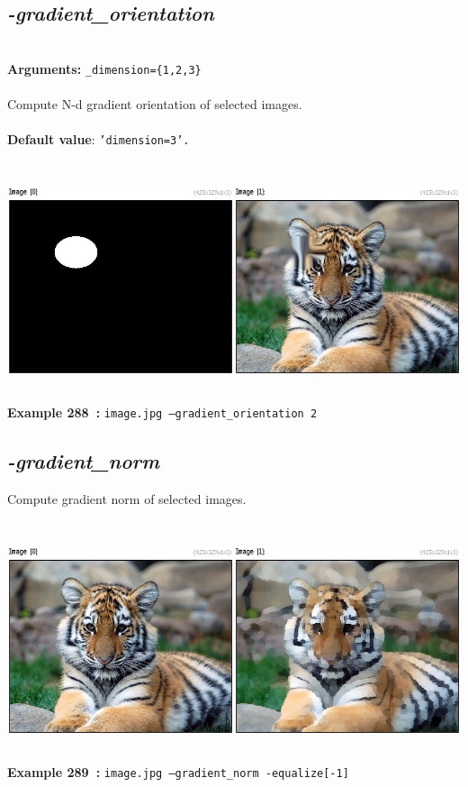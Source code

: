 \documentclass[a4paper,11pt,twoside]{book}
\begin{document}
\subsection{\emph{-gradient\_orientation} }\vspace*{-0.5em}
~\\\textbf{Arguments: } 
{\small \texttt{\_dimension=\{1,2,3\}}}\\~\\
Compute N-d gradient orientation of selected images.
~\\~\\\textbf{Default value}: {\small \texttt{'dimension=3'.}}
\begin{center}\includegraphics[keepaspectratio=true,height=7cm,width=\textwidth]{img/gmic_def288.jpg}\\
{\footnotesize \textbf{Example 288~:} \texttt{image.jpg --gradient\_orientation 2}}
\end{center}

\subsection{\emph{-gradient\_norm} }\vspace*{-0.5em}
Compute gradient norm of selected images.
\begin{center}\includegraphics[keepaspectratio=true,height=7cm,width=\textwidth]{img/gmic_def289.jpg}\\
{\footnotesize \textbf{Example 289~:} \texttt{image.jpg --gradient\_norm -equalize[-1]}}
\end{center}
\end{document}
